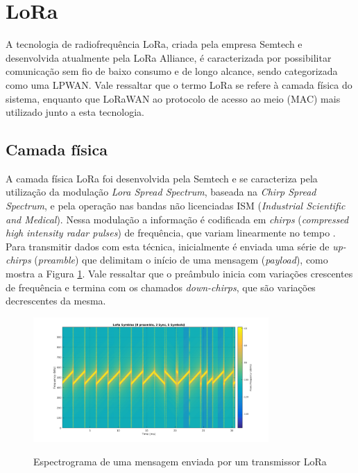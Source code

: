\documentclass[oneside,openright,12pt]{ufsm_2015} %
\begin{document}
\section{LoRa}
A tecnologia de radiofrequência LoRa, criada pela empresa Semtech e desenvolvida atualmente pela LoRa Alliance, é caracterizada por possibilitar comunicação sem fio de baixo consumo e de longo alcance, sendo categorizada como uma LPWAN. Vale ressaltar que o termo LoRa se refere à camada física do sistema, enquanto que LoRaWAN ao protocolo de acesso ao meio (MAC) mais utilizado junto a esta tecnologia.

\subsection{Camada física}
A camada física LoRa foi desenvolvida pela Semtech e se caracteriza pela utilização da modulação \textit{Lora Spread Spectrum}, baseada na \textit{Chirp Spread Spectrum}, e pela operação nas bandas não licenciadas ISM (\textit{Industrial Scientific and Medical}). Nessa modulação a informação é codificada em \textit{chirps} (\textit{compressed high intensity radar pulses}) de frequência, que variam linearmente no tempo \cite{augustin2016study}. Para transmitir dados com esta técnica, inicialmente é enviada uma série de \textit{up-chirps} (\textit{preamble}) que delimitam o início de uma mensagem (\textit{payload}), como mostra a Figura \ref{fig:lora-message}. Vale ressaltar que o preâmbulo inicia com variações crescentes de frequência e termina com os chamados \textit{down-chirps}, que são variações decrescentes da mesma.

\begin{figure}[ht]
    \caption{\label{exepretex} Espectrograma de uma mensagem enviada por um transmissor LoRa}
    \centering
    \includegraphics[width=0.8\textwidth]{figuras/lora-symbols.png}
    \vspace{\baselineskip} %
        \label{fig:lora-message}
\end{figure}
\end{document}

